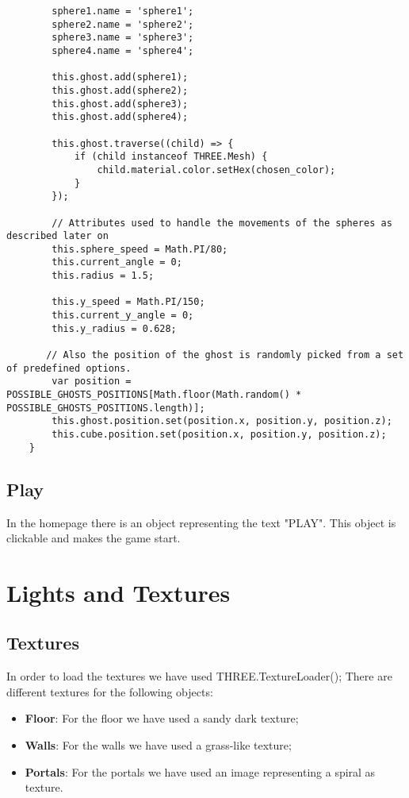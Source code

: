 \documentclass[a4paper,oneside]{report}
\begin{document}
\begin{lstlisting}
        sphere1.name = 'sphere1';
        sphere2.name = 'sphere2';
        sphere3.name = 'sphere3';
        sphere4.name = 'sphere4';

        this.ghost.add(sphere1);
        this.ghost.add(sphere2);
        this.ghost.add(sphere3);
        this.ghost.add(sphere4);

        this.ghost.traverse((child) => {
            if (child instanceof THREE.Mesh) {
                child.material.color.setHex(chosen_color);
            }
        });
        
	    // Attributes used to handle the movements of the spheres as described later on
        this.sphere_speed = Math.PI/80;
        this.current_angle = 0;
        this.radius = 1.5;
        
        this.y_speed = Math.PI/150;
        this.current_y_angle = 0;
        this.y_radius = 0.628;
	
	   // Also the position of the ghost is randomly picked from a set of predefined options.
        var position = POSSIBLE_GHOSTS_POSITIONS[Math.floor(Math.random() * POSSIBLE_GHOSTS_POSITIONS.length)];
        this.ghost.position.set(position.x, position.y, position.z);
        this.cube.position.set(position.x, position.y, position.z);
    }
\end{lstlisting}

\section{Play}
In the homepage there is an object representing the text "PLAY". This object is clickable and makes the game start. 
\chapter{Lights and Textures}
\section{Textures}
In order to load the textures we have used THREE.TextureLoader();
There are different textures for the following objects:
\begin{itemize}
\item \textbf{Floor}: For the floor we have used a sandy dark texture;
\item \textbf{Walls}: For the walls we have used a grass-like texture;
\item \textbf{Portals}: For the portals we have used an image representing a spiral as texture.
\end{itemize}
\end{document}
